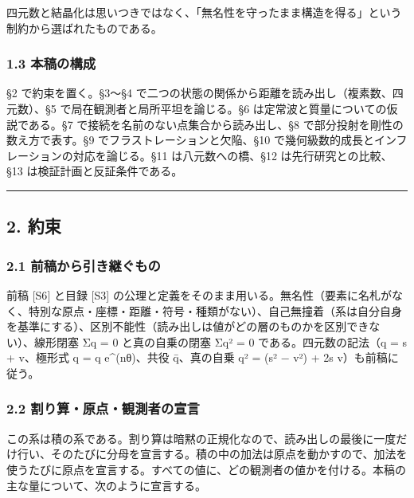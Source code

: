 \documentclass[
  a4paper,
]{ltjsarticle}
\begin{document}
四元数と結晶化は思いつきではなく、「無名性を守ったまま構造を得る」という制約から選ばれたものである。

\subsubsection{1.3 本稿の構成}\label{ux672cux7a3fux306eux69cbux6210}

§2 で約束を置く。§3〜§4
で二つの状態の関係から距離を読み出し（複素数、四元数）、§5
で局在観測者と局所平坦を論じる。§6
は定常波と質量についての仮説である。§7
で接続を名前のない点集合から読み出し、§8
で部分投射を剛性の数え方で表す。§9 でフラストレーションと欠陥、§10
で幾何級数的成長とインフレーションの対応を論じる。§11
は八元数への橋、§12 は先行研究との比較、§13 は検証計画と反証条件である。

\begin{center}\rule{0.5\linewidth}{0.5pt}\end{center}

\subsection{2. 約束}\label{ux7d04ux675f}

\subsubsection{2.1
前稿から引き継ぐもの}\label{ux524dux7a3fux304bux3089ux5f15ux304dux7d99ux3050ux3082ux306e}

前稿 {[}S6{]} と目録 {[}S3{]}
の公理と定義をそのまま用いる。無名性（要素に名札がなく、特別な原点・座標・距離・符号・種類がない）、自己無撞着（系は自分自身を基準にする）、区別不能性（読み出しは値がどの層のものかを区別できない）、線形閉塞
Σq = 0 と真の自乗の閉塞 Σq² = 0 である。四元数の記法（q = s + v、極形式
q = \textbar q\textbar{} e\^{}(nθ)、共役 q̄、真の自乗 q² = (s² −
\textbar v\textbar²) + 2s v）も前稿に従う。

\subsubsection{2.2
割り算・原点・観測者の宣言}\label{ux5272ux308aux7b97ux539fux70b9ux89b3ux6e2cux8005ux306eux5ba3ux8a00}

この系は積の系である。割り算は暗黙の正規化なので、読み出しの最後に一度だけ行い、そのたびに分母を宣言する。積の中の加法は原点を動かすので、加法を使うたびに原点を宣言する。すべての値に、どの観測者の値かを付ける。本稿の主な量について、次のように宣言する。
\end{document}
